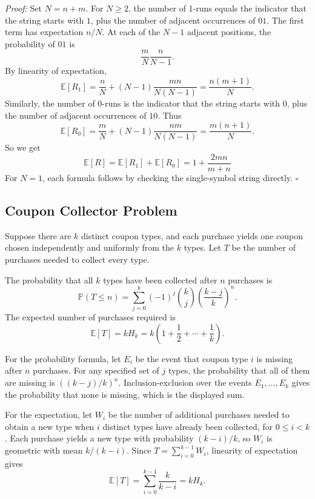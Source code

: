 \documentclass[a4paper,11pt,abstracton]{scrartcl}
\theoremstyle{dotlessP}
\theoremstyle{dotlessS}
\theoremstyle{remark}
\theoremstyle{definition}
\begin{document}
\begin{claim_box}
\textit{Proof:} Set $N=n+m$. For $N\geq2$, the number of 1-runs equals the indicator that the string starts with $1$, plus the number of adjacent occurrences of $01$. The first term has expectation $n/N$. At each of the $N-1$ adjacent positions, the probability of $01$ is
\[
  \frac{m}{N}\frac{n}{N-1}.
\]
By linearity of expectation,
\[
  \mathbb{E}[R_1]=\frac{n}{N}+(N-1)\frac{mn}{N(N-1)}
  =\frac{n(m+1)}{N}.
\]
Similarly, the number of 0-runs is the indicator that the string starts with $0$, plus the number of adjacent occurrences of $10$. Thus
\[
  \mathbb{E}[R_0]=\frac{m}{N}+(N-1)\frac{nm}{N(N-1)}
  =\frac{m(n+1)}{N}.
\]
So we get
\[
\mathbb{E}[R]=\mathbb{E}[R_1]+\mathbb{E}[R_0]=1+\frac{2mn}{m+n}
\]
For $N=1$, each formula follows by checking the single-symbol string directly.
\hfill$\square$
\end{claim_box}

\subsection{Coupon Collector Problem}

Suppose there are $k$ distinct coupon types, and each purchase yields one coupon chosen independently and uniformly from the $k$ types. Let $T$ be the number of purchases needed to collect every type.

\begin{problem_box}
The probability that all $k$ types have been collected after $n$ purchases is
\[
  \mathbb{P}(T\leq n)
  =\sum_{j=0}^{k}(-1)^j\binom{k}{j}\left(\frac{k-j}{k}\right)^n.
\]
The expected number of purchases required is
\[
  \mathbb{E}[T]=kH_k
  =k\left(1+\frac12+\cdots+\frac1k\right).
\]
\end{problem_box}

\begin{claim_box}
For the probability formula, let $E_i$ be the event that coupon type $i$ is missing after $n$ purchases. For any specified set of $j$ types, the probability that all of them are missing is $((k-j)/k)^n$. Inclusion-exclusion over the events $E_1,\ldots,E_k$ gives the probability that none is missing, which is the displayed sum.

For the expectation, let $W_i$ be the number of additional purchases needed to obtain a new type when $i$ distinct types have already been collected, for $0\leq i<k$. Each purchase yields a new type with probability $(k-i)/k$, so $W_i$ is geometric with mean $k/(k-i)$. Since $T=\sum_{i=0}^{k-1}W_i$, linearity of expectation gives
\[
  \mathbb{E}[T]=\sum_{i=0}^{k-1}\frac{k}{k-i}=kH_k.
\]
\end{claim_box}
\end{document}
